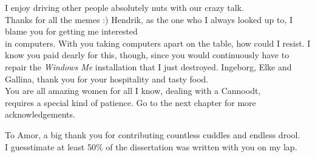 I enjoy driving other people absolutely nuts with our crazy talk.\\Thanks for all the memes :)
Hendrik, as the one who I always looked up to, I blame you for getting me interested\\in computers. With you taking computers apart on the table, how could I resist.
I know you paid dearly for this, though, since you would continuously have to\\repair the \textit{Windows Me} installation that I just destroyed.
Ingeborg, Elke and Gallina, thank you for your hospitality and tasty food.\\You are all amazing women
for all I know, dealing with a Cannoodt,\\requires a special kind of patience.
Go to the next chapter for more acknowledgements.







To Amor, a big thank you for contributing countless cuddles and endless drool.\\I guesstimate at least 50\% of the dissertation was written with you on my lap.


